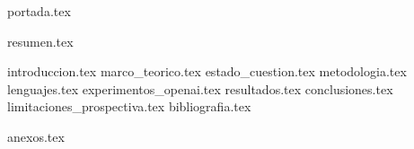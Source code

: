 \documentclass[a4paper,openany,oneside,12pt]{report}
\begin{document}
  {portada.tex}
  \setcounter{page}{2} %

  {resumen.tex}
  \clearpage
  \tableofcontents
  \clearpage
  \listoffigures 
  \clearpage
  \listoftables
  \clearpage
  {introduccion.tex}
  {marco_teorico.tex}
  {estado_cuestion.tex}
  {metodologia.tex}
  {lenguajes.tex}
  {experimentos_openai.tex}
  {resultados.tex}
  {conclusiones.tex}
  {limitaciones_prospectiva.tex}
  {bibliografia.tex}
  \printindex %
  {anexos.tex}
\end{document}
